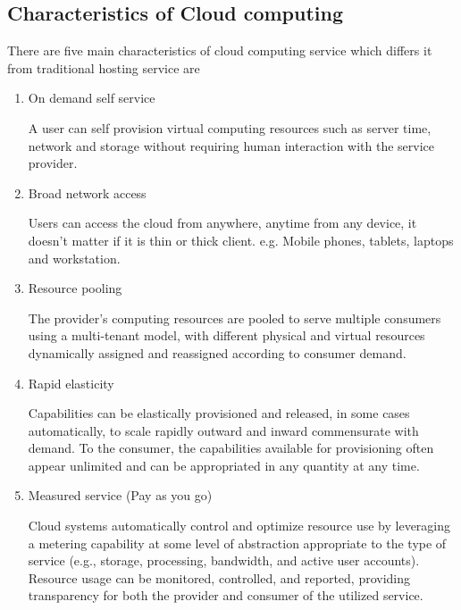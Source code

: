 \subsection{Characteristics of Cloud computing}
There are five main characteristics of cloud computing service which differs it from traditional hosting service are
\par
\begin{enumerate}
\item On demand self service
    \par A user can self provision virtual computing resources such as server time, network and storage without requiring human interaction with the service provider\cite{wiki}.
\item Broad network access
    \par Users can access the cloud from anywhere, anytime from any device, it doesn't matter if it is thin or thick client. e.g. Mobile phones, tablets, laptops and workstation\cite{wiki}. 
\item Resource pooling
    \par The provider's computing resources are pooled to serve multiple consumers using a multi-tenant model, with different physical and virtual resources dynamically assigned and reassigned according to consumer demand\cite{wiki}. 
\item Rapid elasticity
    \par Capabilities can be elastically provisioned and released, in some cases automatically, to scale rapidly outward and inward commensurate with demand. To the consumer, the capabilities available for provisioning often appear unlimited and can be appropriated in any quantity at any time\cite{wiki}.
\item Measured service (Pay as you go)
    \par Cloud systems automatically control and optimize resource use by leveraging a metering capability at some level of abstraction appropriate to the type of service (e.g., storage, processing, bandwidth, and active user accounts). Resource usage can be monitored, controlled, and reported, providing transparency for both the provider and consumer of the utilized service\cite{wiki}.
\end{enumerate}


